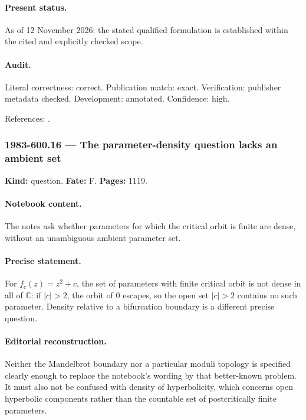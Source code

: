\paragraph{Present status.} As of 12 November 2026: the stated qualified formulation is established within the cited and explicitly checked scope.

\paragraph{Audit.} Literal correctness: correct. Publication match: exact. Verification: publisher metadata checked. Development: annotated. Confidence: high.

\noindent References: \citep{douadyhubbard1985polynomes}.\par

\subsubsection{1983-600.16 --- The parameter-density question lacks an ambient set}

\label{item:1983-600.16}

\noindent\textbf{Kind:} question. \textbf{Fate:} F. \textbf{Pages:} 1119.\par

\paragraph{Notebook content.} The notes ask whether parameters for which the critical orbit is finite are dense, without an unambiguous ambient parameter set.

\paragraph{Precise statement.} For \(f_c(z)=z^2+c\), the set of parameters with finite critical orbit is not dense in all of \(\mathbb C\): if \(|c|>2\), the orbit of 0 escapes, so the open set \(|c|>2\) contains no such parameter. Density relative to a bifurcation boundary is a different precise question.

\paragraph{Editorial reconstruction.} Neither the Mandelbrot boundary nor a particular moduli topology is specified clearly enough to replace the notebook's wording by that better-known problem. It must also not be confused with density of hyperbolicity, which concerns open hyperbolic components rather than the countable set of postcritically finite parameters.

